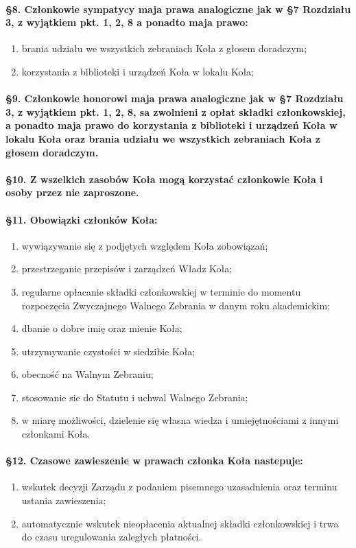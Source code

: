 \documentclass{article}
\begin{document}
\paragraph{\S 8. Członkowie sympatycy maja prawa analogiczne jak w §7 Rozdziału 3, z wyjątkiem pkt. 1, 2, 8 a ponadto maja prawo:}
\begin{enumerate}
			\item brania udziału we wszystkich zebraniach Koła z głosem doradczym;
			\item korzystania z biblioteki i urządzeń Koła w lokalu Koła;
		\end{enumerate}
\paragraph{\S 9. Członkowie honorowi maja prawa analogiczne jak w §7 Rozdziału 3, z wyjątkiem pkt. 1, 2, 8, sa zwolnieni z opłat składki członkowskiej,
           a ponadto maja prawo do korzystania z biblioteki i urządzeń Koła w lokalu Koła oraz brania udziału we wszystkich zebraniach Koła z głosem doradczym.}
\paragraph{\S 10. Z wszelkich zasobów Koła mogą korzystać członkowie Koła i osoby przez nie zaproszone. }
\paragraph{\S 11. Obowiązki członków Koła:}
\begin{enumerate}
			\item wywiązywanie się z podjętych względem Koła zobowiązań;
			\item przestrzeganie przepisów i zarządzeń Władz Koła;
			\item regularne opłacanie składki członkowskiej w terminie do momentu rozpoczęcia Zwyczajnego Walnego Zebrania w danym roku akademickim;
			\item dbanie o dobre imię oraz mienie Koła;
			\item utrzymywanie czystości w siedzibie Koła;
			\item obecność na Walnym Zebraniu;
			\item stosowanie sie do Statutu i uchwal Walnego Zebrania;
			\item w miarę możliwości, dzielenie się własna wiedza i umiejętnościami z innymi członkami Koła.
		\end{enumerate}
\paragraph{\S 12. Czasowe zawieszenie w prawach członka Koła nastepuje:}
\begin{enumerate}
			\item wskutek decyzji Zarządu z podaniem pisemnego uzasadnienia oraz terminu ustania zawieszenia;
			\item automatycznie wskutek nieopłacenia aktualnej składki członkowskiej i trwa do czasu uregulowania zaległych płatności.
		\end{enumerate}
\end{document}
